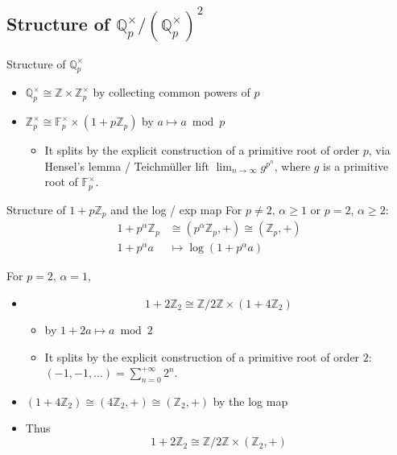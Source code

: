 \documentclass[fontset=fandol,envcountsect]{ctexbeamer}
\providecommand{\tightlist}{%
  \setlength{\itemsep}{0pt}\setlength{\parskip}{0pt}}\usepackage{longtable,booktabs,array}
\theoremstyle{theorem}
\theoremstyle{example}
\theoremstyle{remark}
\theoremstyle{theorem}
\theoremstyle{example}
\theoremstyle{remark}
\begin{document}
\subsection{\texorpdfstring{Structure of
\(\mathbb Q_p^\times / (\mathbb Q_p^\times)^2\)}{Structure of \textbackslash mathbb Q\_p\^{}\textbackslash times / (\textbackslash mathbb Q\_p\^{}\textbackslash times)\^{}2}}\label{structure-of-mathbb-q_ptimes-mathbb-q_ptimes2}

\begin{frame}{Structure of \(\mathbb Q_p^\times\)}
\label{structure-of-mathbb-q_ptimes}
\begin{itemize}
\item
  \(\mathbb Q_p^\times \cong \mathbb Z \times \mathbb Z_p^\times\) by
  collecting common powers of \(p\)
\item
  \(\mathbb Z_p^\times \cong \mathbb F_p^\times \times (1 + p \mathbb Z_p)\)
  by \(a \mapsto a \bmod p\)

  \begin{itemize}
  \tightlist
  \item
    It splits by the explicit construction of a primitive root of order
    \(p\), via Hensel's lemma / Teichmüller lift
    \(\lim_{n \to \infty} g^{p^n}\), where \(g\) is a primitive root of
    \(\mathbb F_p^\times\).
  \end{itemize}
\end{itemize}
\end{frame}

\begin{frame}{Structure of \(1 + p \mathbb Z_p\) and the log / exp map}
\label{structure-of-1-p-mathbb-z_p-and-the-log-exp-map}
For \(p \neq 2,\, \alpha \geq 1\) or \(p = 2,\, \alpha \geq 2\): \[
\begin{aligned}
1 + p^\alpha \mathbb Z_p &\cong (p^\alpha \mathbb Z_p, +) \cong (\mathbb Z_p, +) \\
1 + p^\alpha a &\mapsto \log(1+p^\alpha a)
\end{aligned}
\]

For \(p=2,\,\alpha = 1\),

\begin{itemize}
\item
  \[
  1 + 2 \mathbb Z_2 \cong \mathbb Z / 2 \mathbb Z \times (1 + 4 \mathbb Z_2)
  \]

  \begin{itemize}
  \item
    by \(1 + 2a \mapsto a \bmod 2\)
  \item
    It splits by the explicit construction of a primitive root of order
    \(2\): \((-1,-1,\dots) = \sum_{n=0}^{+\infty} 2^n\).
  \end{itemize}
\item
  \((1 + 4 \mathbb Z_2) \cong (4 \mathbb Z_2, +) \cong (\mathbb Z_2, +)\)
  by the log map
\item
  Thus \[
  1 + 2 \mathbb Z_2 \cong \mathbb Z / 2 \mathbb Z \times (\mathbb Z_2, +)
  \]
\end{itemize}
\end{frame}
\end{document}
